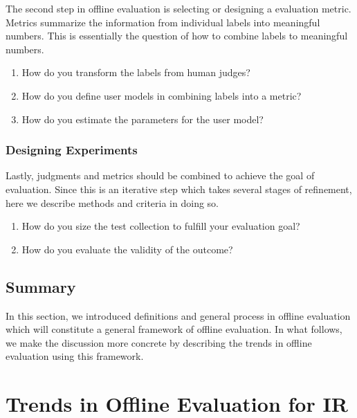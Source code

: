 The second step in offline evaluation is selecting or designing a  evaluation metric. Metrics summarize the information from individual labels into meaningful numbers. This is essentially the question of how to combine labels to meaningful numbers.

\begin{enumerate}
	\item How do you transform the labels from human judges?
	\item How do you define user models in combining labels into a metric? 
	\item How do you estimate the parameters for the user model?
\end{enumerate}

\subsubsection{Designing Experiments}
Lastly, judgments and metrics should be combined to achieve the goal of evaluation. Since this is an iterative step which takes several stages of refinement, here we describe methods and criteria in doing so. 


\begin{enumerate}
	\item How do you size the test collection to fulfill your evaluation goal?
	\item How do you evaluate the validity of the outcome?
\end{enumerate}

\subsection{Summary}
In this section, we introduced definitions and general process in offline evaluation which will constitute a general framework of offline evaluation. In what follows, we make the discussion more concrete by describing the trends in offline evaluation using this framework.

\section{Trends in Offline Evaluation for IR}

